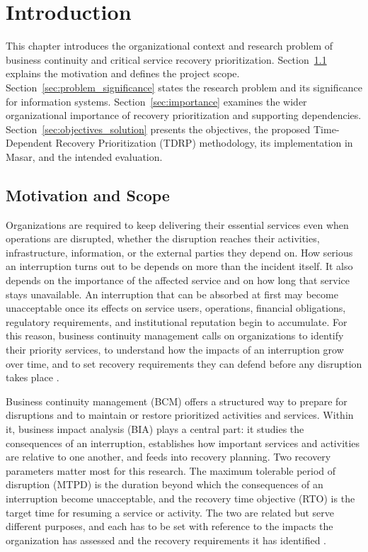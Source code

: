 \chapter{Introduction}
\label{ch:introduction}

This chapter introduces the organizational context and research problem of business continuity and critical service recovery prioritization. Section~\ref{sec:motivation_scope} explains the motivation and defines the project scope. Section~\ref{sec:problem_significance} states the research problem and its significance for information systems. Section~\ref{sec:importance} examines the wider organizational importance of recovery prioritization and supporting dependencies. Section~\ref{sec:objectives_solution} presents the objectives, the proposed Time-Dependent Recovery Prioritization (TDRP) methodology, its implementation in Masar, and the intended evaluation.

\section{Motivation and Scope}
\label{sec:motivation_scope}

Organizations are required to keep delivering their essential services even when operations are disrupted, whether the disruption reaches their activities, infrastructure, information, or the external parties they depend on. How serious an interruption turns out to be depends on more than the incident itself. It also depends on the importance of the affected service and on how long that service stays unavailable. An interruption that can be absorbed at first may become unacceptable once its effects on service users, operations, financial obligations, regulatory requirements, and institutional reputation begin to accumulate. For this reason, business continuity management calls on organizations to identify their priority services, to understand how the impacts of an interruption grow over time, and to set recovery requirements they can defend before any disruption takes place \cite{nrcnationalframework,dga2025bcm}.

Business continuity management (BCM) offers a structured way to prepare for disruptions and to maintain or restore prioritized activities and services. Within it, business impact analysis (BIA) plays a central part: it studies the consequences of an interruption, establishes how important services and activities are relative to one another, and feeds into recovery planning. Two recovery parameters matter most for this research. The maximum tolerable period of disruption (MTPD) is the duration beyond which the consequences of an interruption become unacceptable, and the recovery time objective (RTO) is the target time for resuming a service or activity. The two are related but serve different purposes, and each has to be set with reference to the impacts the organization has assessed and the recovery requirements it has identified \cite{nrcnationalframework,dga2025bcm}.

